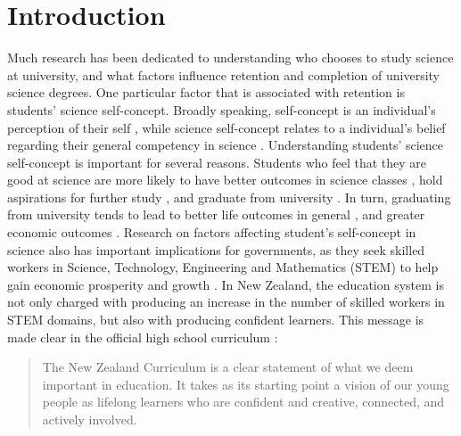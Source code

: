 \section*{Introduction}
\label{intro}
Much research has been dedicated to understanding who chooses to study science at university, and what factors influence retention and completion of university science degrees. One particular factor that is associated with retention is students' science self-concept. Broadly speaking, self-concept is an individual's perception of their self \citep{shavelson1976self}, while science self-concept relates to a individual's belief regarding their general competency in science \citep{jansen2015students}. Understanding students' science self-concept is important for several reasons. Students who feel that they are good at science are more likely to have better outcomes in science classes \citep{uccar2017role,tighezza2014modeling,chang2008science,peters2013examining}, hold aspirations for further study \citep{mujtaba2018students}, and graduate from university \citep{larson2015predicting}. In turn, graduating from university tends to lead to better life outcomes in general \citep{Oreopoulos_2007}, and greater economic outcomes \citep{norton2016mapping,mahoney2013moving}. Research on factors affecting student's self-concept in science also has important implications for governments, as they seek skilled workers in Science, Technology, Engineering and Mathematics (STEM) to help gain economic prosperity and growth \citep{pricewaterhousecoopers2015smart}. In New Zealand, the education system is not only charged with producing an increase in the number of skilled workers in STEM domains, but also with producing confident learners. This message is made clear in the official high school curriculum \citep{NZC}:

\begin{quote}
   The New Zealand Curriculum is a clear statement of what we deem important in education. It takes as its starting point a vision of our young people as lifelong learners who are confident and creative, connected, and actively involved.
\end{quote} 

